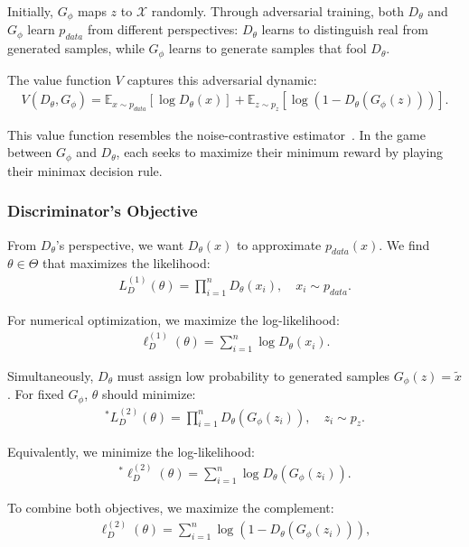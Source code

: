 Initially, $G_\phi$ maps $z$ to $\mathcal{X}$ randomly. Through adversarial training, both $D_\theta$ and $G_\phi$ learn $p_{data}$ from different perspectives: $D_\theta$ learns to distinguish real from generated samples, while $G_\phi$ learns to generate samples that fool $D_\theta$.

The value function $V$ captures this adversarial dynamic:
\begin{align}
  \label{eq:the-original-objective-function}
  V(D_\theta, G_\phi) = \mathbb{E}_{x \sim p_{data}}[\log D_\theta(x)] + \mathbb{E}_{z \sim p_z}[\log(1 - D_\theta(G_\phi(z)))].
\end{align}

This value function resembles the noise-contrastive estimator~\cite{ref:gutmann-2010}. In the game between $G_\phi$ and $D_\theta$, each seeks to maximize their minimum reward by playing their minimax decision rule.

\subsubsection{Discriminator's Objective}%
\label{sec:derivation-d}

From $D_\theta$'s perspective, we want $D_\theta(x)$ to approximate $p_{data}(x)$. We find $\theta \in \Theta$ that maximizes the likelihood:
\begin{align}
  \label{eq:d-1}
  L_D^{(1)}(\theta) = \prod_{i=1}^n D_\theta(x_i), \quad x_i \sim p_{data}.
\end{align}

For numerical optimization, we maximize the log-likelihood:
\begin{align}
  \label{eq:d-l1}
  \ell_D^{(1)}(\theta) = \sum_{i=1}^n \log D_\theta(x_i).
\end{align}

Simultaneously, $D_\theta$ must assign low probability to generated samples $G_\phi(z) = \tilde{x}$. For fixed $G_\phi$, $\theta$ should minimize:
\begin{align}
  ^*L_D^{(2)}(\theta) = \prod_{i=1}^n D_\theta(G_\phi(z_i)), \quad z_i \sim p_z.
\end{align}

Equivalently, we minimize the log-likelihood:
\begin{align}
  \label{eq:d-l2} ^*\ell_D^{(2)}(\theta) = \sum_{i=1}^n \log D_\theta(G_\phi(z_i)).
\end{align}

To combine both objectives, we maximize the complement:
\begin{align}
  \ell_D^{(2)}(\theta) = \sum_{i=1}^n \log(1 - D_\theta(G_\phi(z_i))),
\end{align}

